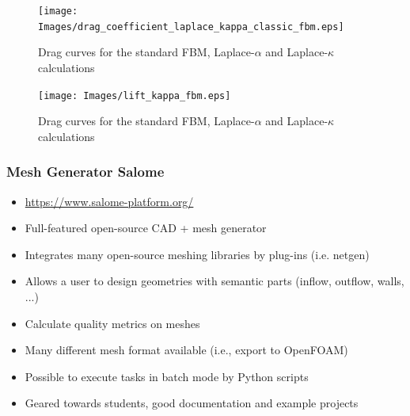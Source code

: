 \begin{frame}[plain]
\begin{figure}[h!]
  \begin{center}
    \texttt{[image: Images/drag\_coefficient\_laplace\_kappa\_classic\_fbm.eps]}
    \caption{Drag curves for the standard FBM, Laplace-$\alpha$ and Laplace-$\kappa$ calculations}
    \label{fig:drag-kappa-classic}
  \end{center}
\end{figure}
\end{frame}

\begin{frame}[plain]
\begin{figure}[h!]
  \begin{center}
    \texttt{[image: Images/lift\_kappa\_fbm.eps]}
    \caption{Drag curves for the standard FBM, Laplace-$\alpha$ and Laplace-$\kappa$ calculations}
    \label{fig:lift-kappa-classic}
  \end{center}
\end{figure}
\end{frame}

\begin{frame}
\frametitle{Mesh Generator Salome}
\begin{itemize}
\item \url{https://www.salome-platform.org/}
\item Full-featured open-source CAD + mesh generator 
\item Integrates many open-source meshing libraries by plug-ins (i.e. netgen)
\item Allows a user to design geometries with semantic parts (inflow, outflow, walls, ...)
\item Calculate quality metrics on meshes
\item Many different mesh format available (i.e., export to OpenFOAM)
\item Possible to execute tasks in batch mode by Python scripts
\item Geared towards students, good documentation and example projects
\end{itemize}
\end{frame}

